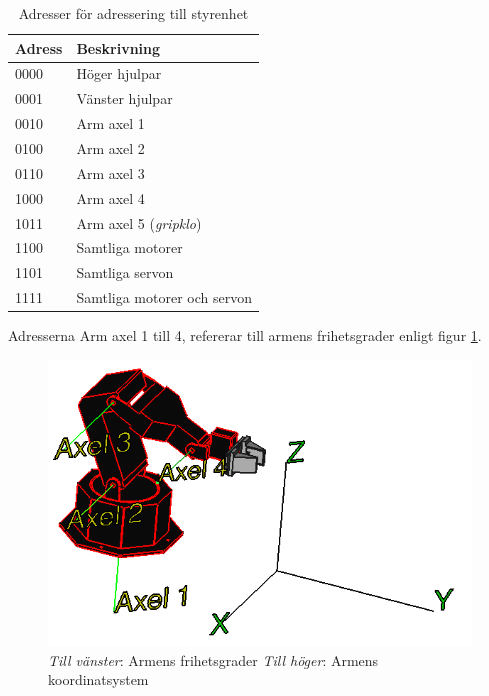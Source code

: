 \begin{table}[H]
	\centering
		\begin{tabularx}{\textwidth}{| l | X |}
			\hline
			\textbf{Adress} & \textbf{Beskrivning} \\
			\hline
			{0000} & {Höger hjulpar} \\
			\hline
			{0001} & {Vänster hjulpar} \\
			\hline
			{0010} & {Arm axel 1} \\ %
			\hline
			{0100} & {Arm axel 2} \\
			\hline
			{0110} & {Arm axel 3} \\
			\hline
			{1000} & {Arm axel 4} \\
			\hline
			{1011} & {Arm axel 5 (\textit{gripklo})} \\ %
			\hline
			{1100} & {Samtliga motorer} \\
			\hline
			{1101} & {Samtliga servon} \\
			\hline
			{1111} & {Samtliga motorer och servon} \\
			\hline
		\end{tabularx}
	\caption{Adresser för adressering till styrenhet} \label{protokoll:pc-motor-adress-tabell}
\end{table}

Adresserna Arm axel 1 till 4, refererar till armens frihetsgrader enligt figur \ref{protokoll-arm-axlar}.

\begin{figure}[H]
\centerline{\includegraphics[scale=0.4]{grafik/protokoll-axlar.png}}
\caption{\textit{Till vänster}: Armens frihetsgrader  \textit{Till höger}: Armens koordinatsystem} \label{protokoll-arm-axlar}
\end{figure}

